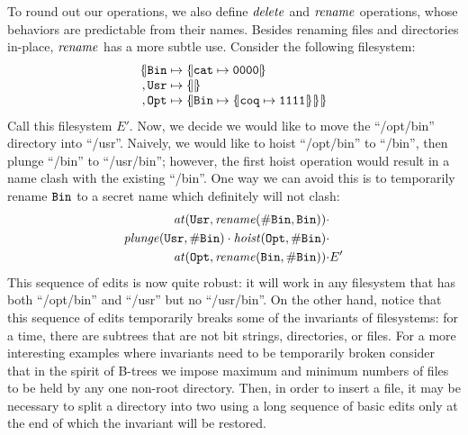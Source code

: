 To round out our operations, we also define $\mathit{delete}$ and $\mathit{rename}$
operations, whose behaviors are predictable from their names.
%
Besides renaming files and directories in-place, $\mathit{rename}$ has a more
subtle use. Consider the following filesystem:
\[
\begin{array}{c@{}r@{\;}l@{\;}l}
    \Open&\Label{Bin}&\To&\Open\Label{cat}\To\Label{0000}\Close\\
    ,    &\Label{Usr}&\To&\Open\Close\\
    ,    &\Label{Opt}&\To&\Open\Label{Bin}\To\Open\Label{coq}\To\Label{1111}\Close\Close\Close
\end{array}
\]
Call this filesystem $E'$. Now, we decide we would like to move the
``/opt/bin'' directory into ``/usr''. Naively, we would like to hoist
``/opt/bin'' to ``/bin'', then plunge ``/bin'' to ``/usr/bin''; however, the
first hoist operation would result in a name clash with the existing
``/bin''. One way we can avoid this is to temporarily rename $\mathtt{Bin}$
to a secret name which definitely will not clash:
\begin{align*}
\mathit{at}(\mathtt{Usr},\mathit{rename}(\mathtt{\#Bin},\mathtt{Bin}))\cdot& \\
\mathit{plunge}(\mathtt{Usr},\mathtt{\#Bin})\cdot\mathit{hoist}(\mathtt{Opt},\mathtt{\#Bin})\cdot& \\
\mathit{at}(\mathtt{Opt},\mathit{rename}(\mathtt{Bin},\mathtt{\#Bin}))\cdot& E'
\end{align*}
This sequence of edits is now quite robust: it will work in any filesystem
that has both ``/opt/bin'' and ``/usr'' but no ``/usr/bin''. On the other
hand, notice that this sequence of edits temporarily breaks some of the
invariants of filesystems: for a time, there are subtrees that are not bit
strings, directories, or files.
%
For a more
 interesting examples where invariants need to be temporarily broken consider that in the spirit of B-trees we impose maximum and minimum numbers of files to be held by any one non-root directory. Then, in order to insert a file, it may be necessary to split a directory into two using a long sequence of basic edits only at the end of which the invariant will be restored.

